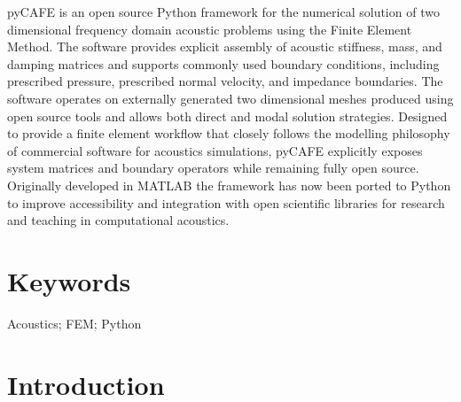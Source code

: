 \documentclass{jors}
\begin{document}
pyCAFE is an open source Python framework for the numerical solution of two dimensional frequency domain acoustic problems using the Finite Element Method. The software provides explicit assembly of acoustic stiffness, mass, and damping matrices and supports commonly used boundary conditions, including prescribed pressure, prescribed normal velocity, and impedance boundaries. The software operates on externally generated two dimensional meshes produced using open source tools and allows both direct and modal solution strategies. Designed to provide a finite element workflow that closely follows the modelling philosophy of commercial software for acoustics simulations, pyCAFE explicitly exposes system matrices and boundary operators while remaining fully open source. Originally developed in MATLAB the framework has now been ported to Python to improve accessibility and integration with open scientific libraries for research and teaching in computational acoustics.

\section*{Keywords}

Acoustics; FEM; Python

\section*{Introduction}
\end{document}
